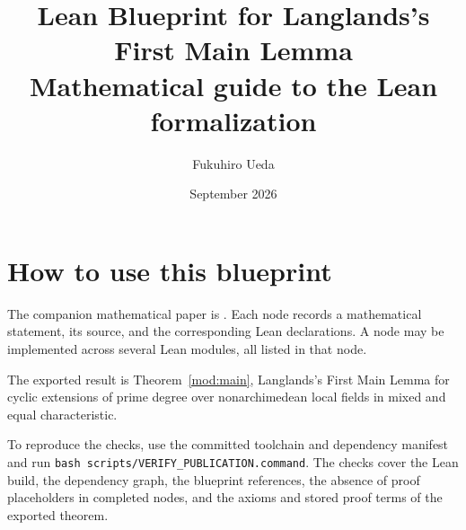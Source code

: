 \documentclass[11pt,oneside]{book}
\title{Lean Blueprint for Langlands's First Main Lemma\\\large Mathematical guide to the Lean formalization}
\author{Fukuhiro Ueda}
\date{September 2026}
\begin{document}
\frontmatter
\maketitle
\chapter*{How to use this blueprint}
The companion mathematical paper is
.  Each node records a mathematical
statement, its source, and the corresponding Lean declarations.  A node
may be implemented across several Lean modules, all listed in that node.

The exported result is Theorem~\ref{mod:main}, Langlands's First Main
Lemma for cyclic extensions of prime degree over nonarchimedean local
fields in mixed and equal characteristic.

To reproduce the checks, use the committed toolchain and dependency
manifest and run \texttt{bash scripts/VERIFY\_PUBLICATION.command}.
The checks cover the Lean build, the dependency graph, the blueprint
references, the absence of proof placeholders in completed nodes, and the
axioms and stored proof terms of the exported theorem.

\tableofcontents
\mainmatter

\end{document}
